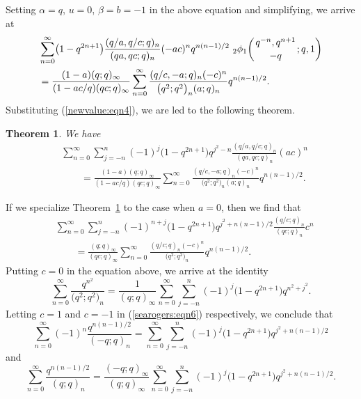 \documentclass[10pt,a4paper]{amsart}
\numberwithin{equation}{section}
\newtheorem{Theorem}{Theorem}[section]
\begin{document}
Setting $\alpha=q$, $u=0$, $\beta=b=-1$ in the above equation and simplifying, we arrive at
\begin{align*}
	&\sum_{n=0}^\infty \bigl(1-q^{2n+1}\bigr)\frac{(q/a, q/c; q)_n}{(q a, q c; q)_n}(-ac)^n q^{n(n-1)/2}~ {_2\phi_1}\biggl({{q^{-n}, q^{n+1}}\atop{-q}}; q, 1\biggr)\\
	&=\frac{(1-a)(q; q )_\infty}{(1-ac/q)(qc; q )_\infty}
	\sum_{n=0}^\infty \frac{(q/c, -a; q)_n (-c)^n}{\bigl(q^2; q^2\bigr)_n (a; q)_n} q^{n(n-1)/2}.
\end{align*}
Substituting (\ref{newvalue:eqn4}), we are led to the following theorem.
\begin{Theorem}\label{andrrthm3} We have
\begin{align*} %
&\sum_{n=0}^\infty \sum_{j=-n}^n (-1)^{j}\bigl(1-q^{2n+1}\bigr) q^{j^2-n}
\frac{(q/a, q/c; q)_n}{(q a, q c; q)_n}(ac)^n \\
&\qquad{}=\frac{(1-a)(q; q )_\infty}{(1-ac/q)(qc; q )_\infty}
\sum_{n=0}^\infty \frac{(q/c, -a; q)_n (-c)^n}{\bigl(q^2; q^2\bigr)_n (a; q)_n} q^{n(n-1)/2}.\nonumber
\end{align*}
\end{Theorem}
If we specialize Theorem~\ref{andrrthm3} to the case when $a=0$, then we find that
\begin{align}
&\sum_{n=0}^\infty \sum_{j=-n}^n (-1)^{n+j}\bigl(1-q^{2n+1}\bigr) q^{j^2+n(n-1)/2}
\frac{(q/c; q)_n}{(q c; q)_n}c^n \nonumber\\
&\qquad{}=\frac{(q; q )_\infty}{(qc; q )_\infty}
\sum_{n=0}^\infty \frac{(q/c; q)_n (-c)^n}{\bigl(q^2; q^2\bigr)_n } q^{n(n-1)/2}.
\label{searogers:eqn6}
\end{align}
Putting $c=0$ in the equation above, we arrive at the identity \cite[equation~(4.12)]{Liu2013IJTN}
\begin{equation*}%
\sum_{n=0}^\infty \frac{q^{n^2}}{\bigl(q^2; q^2\bigr)_n}
=\frac{1}{(q; q)_\infty}
\sum_{n=0}^\infty \sum_{j=-n}^n (-1)^{j} \bigl(1-q^{2n+1}\bigr) q^{n^2+j^2}.
\end{equation*}
Letting $c=1$ and $c=-1$ in (\ref{searogers:eqn6}) respectively, we conclude that \cite[equation~(4.13)]{Liu2013IJTN}
\begin{equation*}%
\sum_{n=0}^\infty (-1)^{n} \frac{q^{n(n-1)/2}}{(-q; q)_n}
=\sum_{n=0}^\infty \sum_{j=-n}^n (-1)^{j} \bigl(1-q^{2n+1}\bigr) q^{j^2+n(n-1)/2}
\end{equation*}
and \cite[equation~(4.14)]{Liu2013IJTN}
\begin{equation*}%
	\sum_{n=0}^\infty \frac{q^{n(n-1)/2}}{(q; q)_n}
	=\frac{(-q; q)_\infty}{(q; q)_\infty}\sum_{n=0}^\infty \sum_{j=-n}^n (-1)^{j} \bigl(1-q^{2n+1}\bigr) q^{j^2+n(n-1)/2}.
\end{equation*}
\end{document}
